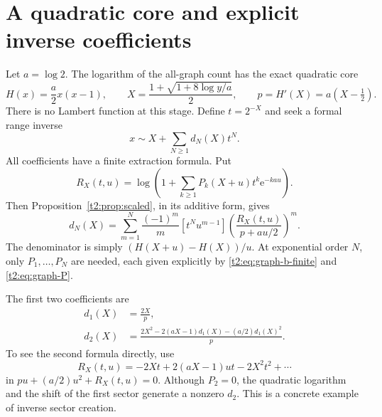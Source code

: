 \documentclass[11pt,openany]{book}
\numberwithin{equation}{chapter}
\theoremstyle{plain}
\theoremstyle{definition}
\theoremstyle{remark}
\newcommand{\ee}{\mathrm e}
\begin{document}
\section{A quadratic core and explicit inverse coefficients}

Let $a=\log2$. The logarithm of the all-graph count has the exact quadratic core
\begin{equation}
 H(x)=\frac a2x(x-1),\qquad
 X=\frac{1+\sqrt{1+8\log y/a}}2,
 \qquad p=H'(X)=a(X-\tfrac12).
 \label{t2:eq:graph-core}
\end{equation}
There is no Lambert function at this stage. Define $t=2^{-X}$ and seek a formal range inverse
\begin{equation}
 x\sim X+\sum_{N\ge1}d_N(X)t^N.
 \label{t2:eq:graph-inverse}
\end{equation}
All coefficients have a finite extraction formula. Put
\begin{equation}
 R_X(t,u)=\log\left(1+\sum_{k\ge1}
                 P_k(X+u)t^k\ee^{-kau}\right).
 \label{t2:eq:graph-R}
\end{equation}
Then Proposition~\ref{t2:prop:scaled}, in its additive form, gives
\begin{equation}
 d_N(X)=\sum_{m=1}^{N}\frac{(-1)^m}{m}
 [t^Nu^{m-1}]\left(\frac{R_X(t,u)}{p+au/2}\right)^m.
 \label{t2:eq:graph-d}
\end{equation}
The denominator is simply $(H(X+u)-H(X))/u$. At exponential order $N$, only $P_1,\ldots,P_N$ are needed, each given explicitly by \eqref{t2:eq:graph-b-finite} and \eqref{t2:eq:graph-P}.

The first two coefficients are
\begin{align}
 d_1(X)&=\frac{2X}{p},\nonumber\\
 d_2(X)&=\frac{2X^2-2(aX-1)d_1(X)-(a/2)d_1(X)^2}{p}.
 \label{t2:eq:graph-d-first}
\end{align}
To see the second formula directly, use
\[
 R_X(t,u)=-2Xt+2(aX-1)ut-2X^2t^2+\cdots
\]
in $pu+(a/2)u^2+R_X(t,u)=0$. Although $P_2=0$, the quadratic logarithm and the shift of the first sector generate a nonzero $d_2$. This is a concrete example of inverse sector creation.
\end{document}
